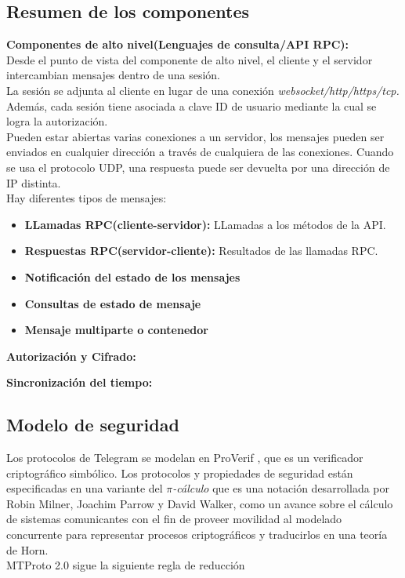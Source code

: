 \subsection{Resumen de los componentes}
\begin{description}
	\item \textbf{Componentes de alto nivel(Lenguajes de consulta/API RPC):}\\
Desde el punto de vista del componente de alto nivel, el cliente y el servidor intercambian mensajes dentro de una sesión.\\
La sesión se adjunta al cliente en lugar de una conexión \emph{websocket/http/https/tcp.} 
Además, cada sesión tiene asociada a clave ID de usuario mediante la cual se logra la autorización.\\ 
Pueden estar abiertas varias conexiones a un servidor, los mensajes pueden ser enviados en cualquier dirección a través de cualquiera de las conexiones.
Cuando se usa el protocolo UDP, una respuesta puede ser devuelta por una dirección de IP distinta.\\
Hay diferentes tipos de mensajes:
\begin{itemize}
		\item \textbf{LLamadas RPC(cliente-servidor):} LLamadas a los métodos de la API.
		\item \textbf{Respuestas RPC(servidor-cliente):} Resultados de las llamadas RPC.
		\item \textbf{Notificación del estado de los mensajes}
		\item \textbf{Consultas de estado de mensaje}
		\item \textbf{Mensaje multiparte o contenedor}
\end{itemize}

	\item \textbf{Autorización y Cifrado:}
	\item \textbf{Sincronización del tiempo:}
\end{description}
\subsection{Modelo de seguridad}
Los protocolos de Telegram se modelan en ProVerif \cite{ProVer}, que es un verificador criptográfico simbólico. Los protocolos y propiedades de seguridad están especificadas en una variante del \emph{$\pi$-cálculo} que es una notación desarrollada por Robin Milner, Joachim Parrow y David Walker, como un avance sobre el cálculo de sistemas comunicantes con el fin de proveer movilidad al modelado concurrente para representar procesos criptográficos y traducirlos en una teoría de Horn. \\
MTProto 2.0 sigue la siguiente regla de reducción


